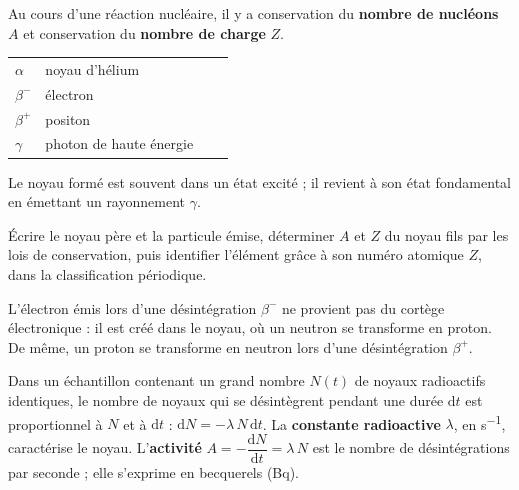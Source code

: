 \begin{loi}
Au cours d'une réaction nucléaire, il y a conservation du \textbf{nombre de nucléons} $A$ et conservation du
\textbf{nombre de charge} $Z$.
\end{loi}
\begin{propriete}
\par\smallskip
{\small\renewcommand{\arraystretch}{1.35}
\begin{tabularx}{\linewidth}{@{}lYll@{}}\toprule
{} &  &  & \\\midrule
$\alpha$ & noyau d'hélium  &  & \\
$\beta^-$ & électron  &  & \\
$\beta^+$ & positon  &  & \\
$\gamma$ & photon de haute énergie &  & \\\bottomrule
\end{tabularx}}
\par\smallskip
Le noyau formé est souvent dans un état excité ; il revient à son état fondamental en émettant un rayonnement $\gamma$.
\end{propriete}
\begin{savoirfaire}
Écrire le noyau père et la particule émise, déterminer $A$ et $Z$ du noyau fils par les lois de conservation, puis
identifier l'élément grâce à son numéro atomique $Z$, dans la classification périodique.
\end{savoirfaire}
\begin{attention}
L'électron émis lors d'une désintégration $\beta^-$ ne provient pas du cortège électronique : il est créé dans le
noyau, où un neutron se transforme en proton. De même, un proton se transforme en neutron lors d'une désintégration $\beta^+$.
\end{attention}
\begin{definition}
Dans un échantillon contenant un grand nombre $N(t)$ de noyaux radioactifs identiques, le nombre de noyaux qui se
désintègrent pendant une durée $\mathrm{d}t$ est proportionnel à $N$ et à $\mathrm{d}t$ :
$\mathrm{d}N=-\lambda\,N\,\mathrm{d}t$. La \textbf{constante radioactive} $\lambda$, en \unit{s^{-1}}, caractérise le noyau.
L'\textbf{activité} $A=-\dfrac{\mathrm{d}N}{\mathrm{d}t}=\lambda\,N$ est le nombre de désintégrations par seconde ; elle
s'exprime en becquerels (Bq).
\end{definition}
